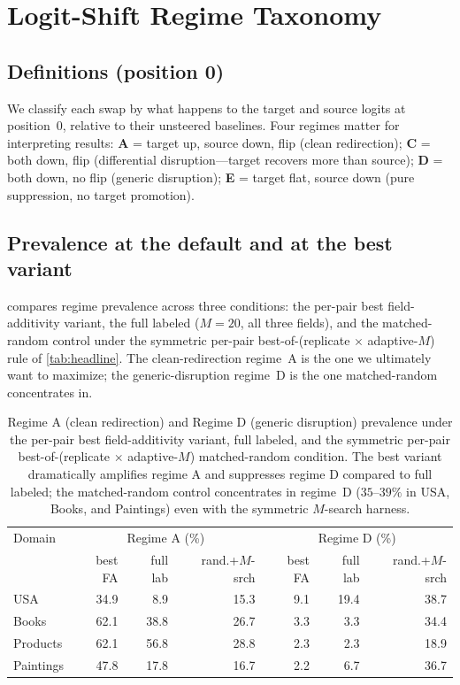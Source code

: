 




\section{Logit-Shift Regime Taxonomy}
\label{appx:regime}

\subsection{Definitions (position 0)}
We classify each swap by what happens to the target and source logits at position~0, relative to their unsteered baselines. Four regimes matter for interpreting results: \textbf{A} = target up, source down, flip (clean redirection); \textbf{C} = both down, flip (differential disruption---target recovers more than source); \textbf{D} = both down, no flip (generic disruption); \textbf{E} = target flat, source down (pure suppression, no target promotion).

\subsection{Prevalence at the default and at the best variant}
 compares regime prevalence across three conditions: the per-pair best field-additivity variant, the full labeled ($M{=}20$, all three fields), and the matched-random control under the symmetric per-pair best-of-(replicate $\times$ adaptive-$M$) rule of \cref{tab:headline}. The clean-redirection regime~A is the one we ultimately want to maximize; the generic-disruption regime~D is the one matched-random concentrates in.

\begin{table}[h]
\centering\small
\begin{tabular}{lrrr|rrr}
\toprule
Domain    & \multicolumn{3}{c|}{Regime A (\%)} & \multicolumn{3}{c}{Regime D (\%)} \\
          & best FA & full lab & rand.+$M$-srch & best FA & full lab & rand.+$M$-srch \\
\midrule
USA       & 34.9 &  8.9 & 15.3 &  9.1 & 19.4 & 38.7 \\
Books     & 62.1 & 38.8 & 26.7 &  3.3 &  3.3 & 34.4 \\
Products  & 62.1 & 56.8 & 28.8 &  2.3 &  2.3 & 18.9 \\
Paintings & 47.8 & 17.8 & 16.7 &  2.2 &  6.7 & 36.7 \\
\bottomrule
\end{tabular}
\caption{Regime A (clean redirection) and Regime D (generic disruption) prevalence under the per-pair best field-additivity variant, full labeled, and the symmetric per-pair best-of-(replicate $\times$ adaptive-$M$) matched-random condition. The best variant dramatically amplifies regime A and suppresses regime D compared to full labeled; the matched-random control concentrates in regime~D ($35$--$39\%$ in USA, Books, and Paintings) even with the symmetric $M$-search harness.}
\label{tab:regime-prev}
\end{table}

